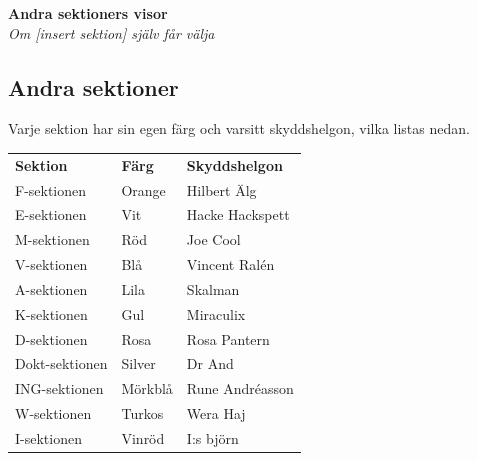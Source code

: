 \begin{center}
    \vspace*{1.5cm}
    {\fontsize{20}{20}\textbf{Andra sektioners visor}}\\
    \vspace{0.7cm}
    {\fontsize{12}{12}\textit{Om [insert sektion] själv får välja}}  
\end{center}
\newpage
\resetBackground

\subsection*{Andra sektioner}

Varje sektion har sin egen färg och varsitt skyddshelgon, vilka listas nedan.

\renewcommand{\arraystretch}{1.3}
\setlength{\tabcolsep}{10pt}

\begin{center}
\begin{tabular}{lll}
\textbf{Sektion} & \textbf{Färg} & \textbf{Skyddshelgon} \\

F-sektionen & Orange & Hilbert Älg \\
E-sektionen & Vit & Hacke Hackspett \\
M-sektionen & Röd & Joe Cool \\
V-sektionen & Blå & Vincent Ralén \\
A-sektionen & Lila & Skalman \\
K-sektionen & Gul & Miraculix \\
D-sektionen & Rosa & Rosa Pantern \\
Dokt-sektionen & Silver & Dr And \\
ING-sektionen & Mörkblå & Rune Andréasson \\
W-sektionen & Turkos & Wera Haj \\
I-sektionen & Vinröd & I:s björn \\
\end{tabular}
\end{center}

